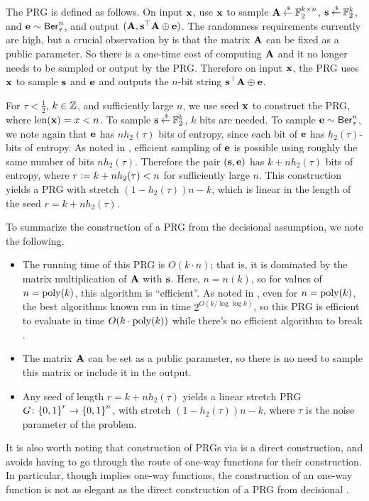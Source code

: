 The PRG is defined as follows. 
On input ${\mathbf x}$, use ${\mathbf x}$ to sample ${\mathbf A} \mathbin{\stackrel{\mbox{\,\tiny \$}}{\gets}} {\mathbb F}_2^{k\times n}$, ${\mathbf s} \mathbin{\stackrel{\mbox{\,\tiny \$}}{\gets}} {\mathbb F}_2^k$, and ${\mathbf e} \sim \mathsf{Ber}_\tau^n$, and output $({\mathbf A}, {\mathbf s}^\top{\mathbf A}\oplus{\mathbf e})$.
The randomness requirements currently are high, but a crucial observation by \cite{C:ACPS09} is that the matrix ${\mathbf A}$ can be fixed as a public parameter.
So there is a one-time cost of computing ${\mathbf A}$ and it no longer needs to be sampled or output by the PRG.
Therefore on input ${\mathbf x}$, the PRG uses ${\mathbf x}$ to sample ${\mathbf s}$ and ${\mathbf e}$ and outputs the $n$-bit string ${\mathbf s}^\top{\mathbf A}\oplus{\mathbf e}$.

For $\tau < \frac{1}{2}$, $k \in {\mathbb Z}$, and sufficiently large $n$, we use seed ${\mathbf x}$ to construct the PRG, where $\mathrm{len}({\mathbf x}) = x < n$.
To sample ${\mathbf s} \mathbin{\stackrel{\mbox{\,\tiny \$}}{\gets}} {\mathbb F}_2^k$, $k$ bits are needed.
To sample ${\mathbf e}\sim\mathsf{Ber}_\tau^n$, we note again that ${\mathbf e}$ has $nh_2(\tau)$ bits of entropy, since each bit of ${\mathbf e}$ has $h_2(\tau)$-bits of entropy.
As noted in \cite{C:ACPS09}, efficient sampling of ${\mathbf e}$ is possible using roughly the same number of bits $nh_2(\tau)$.
Therefore the pair $({\mathbf s},{\mathbf e})$ has $k+nh_2(\tau)$ bits of entropy, where $r{\;\vcentcolon=\;} k+nh_2(\tau) < n$ for sufficiently large $n$.
This construction yields a PRG with stretch $(1 - h_2(\tau))n-k$, which is linear in the length of the seed $r = k+nh_2(\tau)$.

To summarize the construction of a PRG from the decisional \LPN assumption, we note the following.
\begin{itemize}
	\item The running time of this PRG is $O(k\cdot n)$; that is, it is dominated by the matrix multiplication of ${\mathbf A}$ with ${\mathbf s}$.
	Here, $n = n(k)$, so for values of $n = \operatorname{poly}(k)$, this algorithm is ``efficient''.
	As noted in , even for $n = \operatorname{poly}(k)$, the best algorithms known run in time $2^{O(k/\log\log k)}$, so this PRG is efficient to evaluate in time $O(k\cdot\operatorname{poly}(k))$ while there's no efficient algorithm to break \LPN.
	\item The matrix ${\mathbf A}$ can be set as a public parameter, so there is no need to sample this matrix or include it in the output.
	\item Any seed of length $r = k + nh_2(\tau)$ yields a linear stretch PRG $G \colon {\{0,1\}}^r \rightarrow {\{0,1\}}^n$, with stretch $(1-h_2(\tau))n - k$, where $\tau$ is the noise parameter of the \LPN problem.
\end{itemize}
It is also worth noting that construction of PRGs via \LPN is a direct construction, and avoids having to go through the route of one-way functions for their construction.
In particular, though \LPN implies one-way functions, the construction of an \LPN one-way function is not as elegant as the direct construction of a PRG from decisional \LPN.




